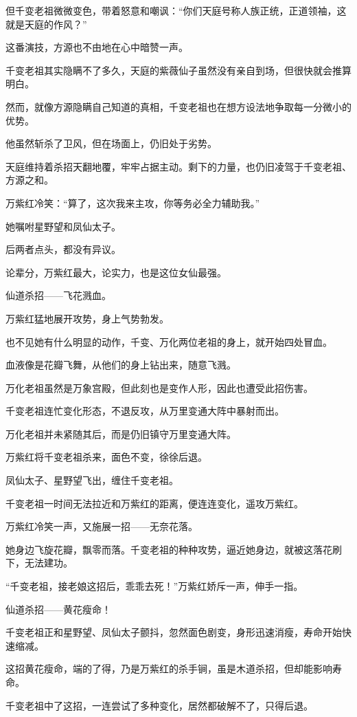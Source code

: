 \begin{this_body}
但千变老祖微微变色，带着怒意和嘲讽：“你们天庭号称人族正统，正道领袖，这就是天庭的作风？”

这番演技，方源也不由地在心中暗赞一声。

千变老祖其实隐瞒不了多久，天庭的紫薇仙子虽然没有亲自到场，但很快就会推算明白。

然而，就像方源隐瞒自己知道的真相，千变老祖也在想方设法地争取每一分微小的优势。

他虽然斩杀了卫风，但在场面上，仍旧处于劣势。

天庭维持着杀招天翻地覆，牢牢占据主动。剩下的力量，也仍旧凌驾于千变老祖、方源之和。

万紫红冷笑：“算了，这次我来主攻，你等务必全力辅助我。”

她嘱咐星野望和凤仙太子。

后两者点头，都没有异议。

论辈分，万紫红最大，论实力，也是这位女仙最强。

仙道杀招——飞花溅血。

万紫红猛地展开攻势，身上气势勃发。

也不见她有什么明显的动作，千变、万化两位老祖的身上，就开始四处冒血。

血液像是花瓣飞舞，从他们的身上钻出来，随意飞溅。

万化老祖虽然是万象宫殿，但此刻也是变作人形，因此也遭受此招伤害。

千变老祖连忙变化形态，不退反攻，从万里变通大阵中暴射而出。

万化老祖并未紧随其后，而是仍旧镇守万里变通大阵。

万紫红将千变老祖杀来，面色不变，徐徐后退。

凤仙太子、星野望飞出，缠住千变老祖。

千变老祖一时间无法拉近和万紫红的距离，便连连变化，遥攻万紫红。

万紫红冷笑一声，又施展一招——无奈花落。

她身边飞旋花瓣，飘零而落。千变老祖的种种攻势，逼近她身边，就被这落花刷下，无法建功。

“千变老祖，接老娘这招后，乖乖去死！”万紫红娇斥一声，伸手一指。

仙道杀招——黄花瘦命！

千变老祖正和星野望、凤仙太子颤抖，忽然面色剧变，身形迅速消瘦，寿命开始快速缩减。

这招黄花瘦命，端的了得，乃是万紫红的杀手锏，虽是木道杀招，但却能影响寿命。

千变老祖中了这招，一连尝试了多种变化，居然都破解不了，只得后退。


\end{this_body}
